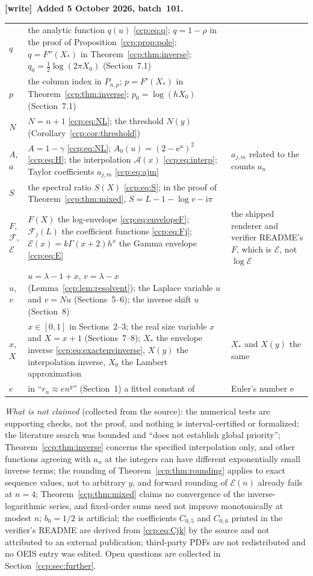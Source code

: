 \documentclass[11pt,letterpaper]{article}
\theoremstyle{remark}\newtheorem{remark}[theorem]{Remark}
\newcommand{\ii}{\mathrm i}
\newcommand{\ee}{\mathrm e}
\newenvironment{writenote}[1][]{\par\smallskip\begingroup\small
 \noindent\textbf{[write]}\if\relax\detokenize{#1}\relax\else~\textbf{#1.}\fi\ }%
 {\par\endgroup\smallskip}
\begin{document}
\begin{writenote}[Added 5 October 2026, batch~101]
\begin{longtable}{@{}p{0.5in}p{3.85in}p{1.95in}@{}}
$q$ & the analytic function $q(u)$ \eqref{ccp:eq:q}; $q=1-\rho$ in the
 proof of Proposition~\ref{ccp:prop:pole}; $q=F''(X_*)$ in
 Theorem~\ref{ccp:thm:inverse}; $q_0=\frac12\log(2\pi X_0)$ (Section~7.1)
 & \\
$p$ & the column index in $P_{n,p}$; $p=F'(X_*)$ in
 Theorem~\ref{ccp:thm:inverse}; $p_0=\log(hX_0)$ (Section~7.1) & \\
$N$ & $N=n+1$ \eqref{ccp:eq:NL}; the threshold $N(y)$
 (Corollary~\ref{ccp:cor:threshold}) & \\
$A$, $a$ & $A=1-\gamma$ \eqref{ccp:eq:NL}; $A_0(u)=(2-\ee^u)^2$
 \eqref{ccp:eq:H}; the interpolation $\mathcal A(x)$ \eqref{ccp:eq:interp};
 Taylor coefficients $a_{j,m}$ \eqref{ccp:eq:ajm} & $a_{j,m}$ related to
 the counts $a_n$\\
$S$ & the spectral ratio $S(X)$ \eqref{ccp:eq:S}; in the proof of
 Theorem~\ref{ccp:thm:mixed}, $S=L-1-\log v-\ii\pi$ & \\
$F$, $\mathcal F$, $\mathcal E$ & $F(X)$ the log-envelope
 \eqref{ccp:eq:envelopeF}; $\mathcal F_j(L)$ the coefficient functions
 \eqref{ccp:eq:Fj}; $\mathcal E(x)=k\Gamma(x+2)h^x$ the Gamma envelope
 \eqref{ccp:eq:E} & the shipped renderer and verifier README's $F$, which
 is $\mathcal E$, not $\log\mathcal E$\\
$u$, $v$ & $u=\lambda-1+x$, $v=\lambda-x$ (Lemma~\ref{ccp:lem:resolvent});
 the Laplace variable $u$ and $v=Nu$ (Sections~5--6); the inverse shift $u$
 (Section~8) & \\
$x$, $X$ & $x\in[0,1]$ in Sections~2--3; the real size variable $x$ and
 $X=x+1$ (Sections~7--8); $X_*$ the envelope inverse
 \eqref{ccp:eq:exactenvinverse}, $X(y)$ the interpolation inverse, $X_0$
 the Lambert approximation & $X_*$ and $X(y)$ the same\\
$e$ & in ``$r_n\approx en^g$'' (Section~1) a fitted constant of~\cite{bdgr}
 & Euler's number $\ee$\\
\bottomrule
\end{longtable}
\endgroup

\emph{What is not claimed} (collected from the source): the numerical tests
are supporting checks, not the proof, and nothing is interval-certified or
formalized; the literature search was bounded and ``does not establish
global priority''; Theorem~\ref{ccp:thm:inverse} concerns the specified
interpolation only, and other functions agreeing with $a_n$ at the integers
can have different exponentially small inverse terms; the rounding of
Theorem~\ref{ccp:thm:rounding} applies to exact sequence values, not to
arbitrary $y$, and forward rounding of $\mathcal E(n)$ already fails at
$n=4$; Theorem~\ref{ccp:thm:mixed} claims no convergence of the
inverse-logarithmic series, and fixed-order sums need not improve
monotonically at modest $n$; $b_0=1/2$ is artificial; the coefficients
$C_{0,5}$ and $C_{0,6}$ printed in the verifier's README are derived from
\eqref{ccp:eq:Cjk} by the source and not attributed to an external
publication; third-party PDFs are not redistributed and no OEIS entry was
edited. Open questions are collected in Section~\ref{ccp:sec:further}.
\end{writenote}
\end{document}
